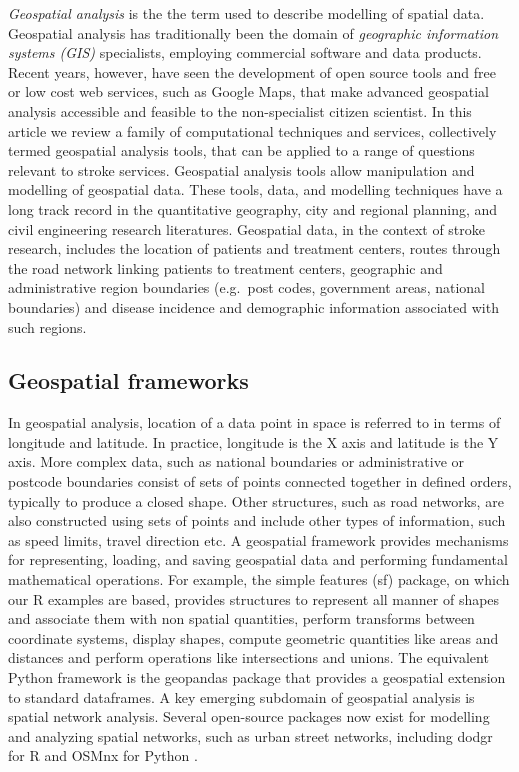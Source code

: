 \documentclass[utf8]{frontiersHLTH}
\begin{document}
{\em Geospatial analysis} is the the term used to describe modelling
of spatial data. Geospatial analysis has traditionally been the domain
of {\em geographic information systems (GIS)} specialists, employing
commercial software and data products. Recent years, however, have
seen the development of open source tools and free or low cost web
services, such as Google Maps, that make advanced geospatial analysis
accessible and feasible to the non-specialist citizen scientist. In
this article we review a family of computational techniques and
services, collectively termed geospatial analysis tools, that can be
applied to a range of questions relevant to stroke
services. Geospatial analysis tools allow manipulation and modelling
of geospatial data.  These tools, data, and modelling techniques have
a long track record in the quantitative geography, city and regional
planning, and civil engineering research literatures. Geospatial data,
in the context of stroke research, includes the location of patients
and treatment centers, routes through the road network linking
patients to treatment centers, geographic and administrative region
boundaries (e.g.~post codes, government areas, national boundaries)
and disease incidence and demographic information associated with such
regions.


\subsection{Geospatial frameworks}\label{geospatial-frameworks}

In geospatial analysis, location of a data point in space is referred to
in terms of longitude and latitude. In practice, longitude is the X
axis and latitude is the Y axis. More complex data, such as
national boundaries or administrative or postcode boundaries consist
of sets of points connected together in defined orders, typically to
produce a closed shape. Other structures, such as road networks, are
also constructed using sets of points and include other types of
information, such as speed limits, travel direction etc. A geospatial
framework provides mechanisms for representing, loading, and saving
geospatial data and performing fundamental mathematical
operations. For example, the simple features (sf) \cite{Pebesma_2018}
package, on which our R examples are based, provides structures to
represent all manner of shapes and associate them with non spatial
quantities, perform transforms between coordinate systems, display
shapes, compute geometric quantities like areas and distances and
perform operations like intersections and unions. The equivalent
Python framework is the geopandas package that provides a geospatial
extension to standard dataframes. A key emerging subdomain of 
geospatial analysis is spatial network analysis. Several open-source 
packages now exist for modelling and analyzing spatial networks, 
such as urban street networks, including dodgr for R \cite{Padgham_2019}
and OSMnx for Python \cite{boeing_osmnx_2017}.
\end{document}

